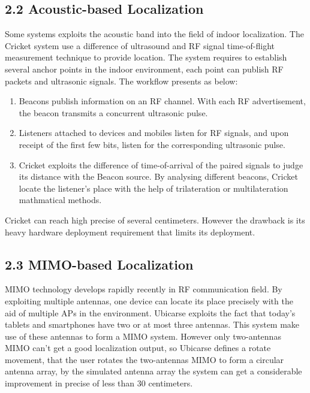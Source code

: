 \documentclass[a4paper, 11pt]{article} %
\begin{document}
\subsection*{2.2 Acoustic-based Localization \cite{Cricket04}}
Some systems exploits the acoustic band into the field of indoor localization. The Cricket system \cite{Cricket04} use a difference of ultrasound and RF signal time-of-flight measurement technique to provide location. The system requires to establish several anchor points in the indoor environment, each point can publish RF packets and ultrasonic signals. The workflow presents as below: 

\begin{enumerate}
	\item Beacons publish information on an RF channel. With each RF advertisement, the beacon transmits a concurrent ultrasonic pulse.
	\item Listeners attached to devices and mobiles listen for RF signals, and upon receipt of the first few bits, listen for the corresponding ultrasonic pulse.
	\item Cricket exploits the difference of time-of-arrival of the paired signals to judge its distance with the Beacon source. By analysing different beacons, Cricket locate the listener's place with the help of trilateration or multilateration mathmatical methods.
\end{enumerate}

Cricket can reach high precise of several centimeters. However the drawback is its heavy hardware deployment requirement that limits its deployment.


\subsection*{2.3 MIMO-based Localization \cite{Ubicarse14}}
MIMO technology develops rapidly recently in RF communication field. By exploiting multiple antennas, one device can locate its place precisely with the aid of multiple APs in the environment. Ubicarse exploits the fact that today's tablets and smartphones have two or at most three antennas. This system make use of these antennas to form a MIMO system. However only two-antennas MIMO can't get a good localization output, so Ubicarse defines a rotate movement, that the user rotates the two-antennas MIMO to form a circular antenna array, by the simulated antenna array the system can get a considerable improvement in precise of less than 30 centimeters.


\end{document}
